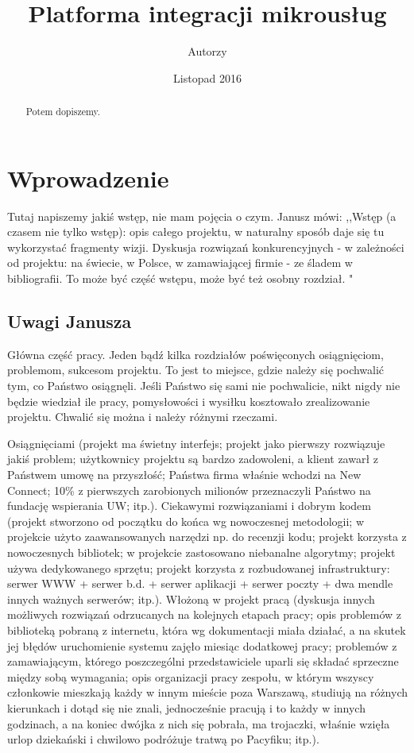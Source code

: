 \documentclass[licencjacka]{pracamgr}
\author{Autorzy}
\title{Platforma integracji mikrousług}
\date{Listopad 2016}
\begin{document}
\maketitle

\begin{abstract}
  Potem dopiszemy.
\end{abstract}

\tableofcontents

\chapter*{Wprowadzenie} 
Tutaj napiszemy jakiś wstęp, nie mam pojęcia o czym. Janusz mówi: ,,Wstęp (a czasem nie tylko wstęp): opis całego projektu, w naturalny sposób daje się tu wykorzystać fragmenty wizji. Dyskusja rozwiązań konkurencyjnych - w zależności od projektu: na świecie, w Polsce, w zamawiającej firmie - ze śladem w bibliografii. To może być część wstępu, może być też osobny rozdział. "

\section{Uwagi Janusza}
Główna część pracy. Jeden bądź kilka rozdziałów poświęconych osiągnięciom, problemom, sukcesom projektu. To jest to miejsce, gdzie należy się pochwalić tym, co Państwo osiągnęli. Jeśli Państwo się sami nie pochwalicie, nikt nigdy nie będzie wiedział ile pracy, pomysłowości i wysiłku kosztowało zrealizowanie projektu. Chwalić się można i należy różnymi rzeczami.

Osiągnięciami (projekt ma świetny interfejs; projekt jako pierwszy rozwiązuje jakiś problem; użytkownicy projektu są bardzo zadowoleni, a klient zawarł z Państwem umowę na przyszłość; Państwa firma właśnie wchodzi na New Connect; 10\% z pierwszych zarobionych milionów przeznaczyli Państwo na fundację wspierania UW; itp.).
Ciekawymi rozwiązaniami i dobrym kodem (projekt stworzono od początku do końca wg nowoczesnej metodologii; w projekcie użyto zaawansowanych narzędzi np. do recenzji kodu; projekt korzysta z nowoczesnych bibliotek; w projekcie zastosowano niebanalne algorytmy; projekt używa dedykowanego sprzętu; projekt korzysta z rozbudowanej infrastruktury: serwer WWW + serwer b.d. + serwer aplikacji + serwer poczty + dwa mendle innych ważnych serwerów; itp.).
Włożoną w projekt pracą (dyskusja innych możliwych rozwiązań odrzucanych na kolejnych etapach pracy; opis problemów z biblioteką pobraną z internetu, która wg dokumentacji miała działać, a na skutek jej błędów uruchomienie systemu zajęło miesiąc dodatkowej pracy; problemów z zamawiającym, którego poszczególni przedstawiciele uparli się składać sprzeczne między sobą wymagania; opis organizacji pracy zespołu, w którym wszyscy członkowie mieszkają każdy w innym mieście poza Warszawą, studiują na różnych kierunkach i dotąd się nie znali, jednocześnie pracują i to każdy w innych godzinach, a na koniec dwójka z nich się pobrała, ma trojaczki, właśnie wzięła urlop dziekański i chwilowo podróżuje tratwą po Pacyfiku; itp.).
\end{document}
